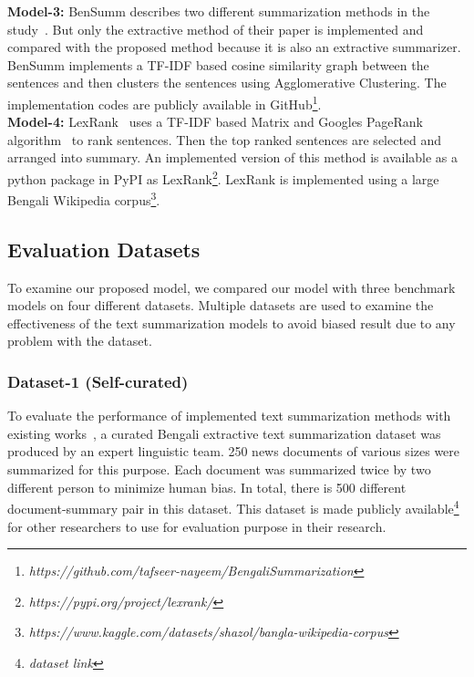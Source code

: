 \textbf{Model-3:} BenSumm describes two different summarization methods in the study~\cite{chowdhury-etal-2021-tfidf-clustering}. But only the extractive method of their paper is implemented and compared with the proposed method because it is also an extractive summarizer. BenSumm implements a TF-IDF based cosine similarity graph between the sentences and then clusters the sentences using Agglomerative Clustering. The implementation codes are publicly available in GitHub\footnote{\textit{https://github.com/tafseer-nayeem/BengaliSummarization}}.\\

\textbf{Model-4:} LexRank~\cite{Erkan-lexRank-2004} uses a TF-IDF based Matrix and Googles PageRank algorithm~\cite{page-PageRank-1999} to rank sentences. Then the top ranked sentences are selected and arranged into summary. An implemented version of this method is available as a python package in PyPI as LexRank\footnote{\textit{https://pypi.org/project/lexrank/}}. LexRank is implemented using a large Bengali Wikipedia corpus\footnote{\textit{https://www.kaggle.com/datasets/shazol/bangla-wikipedia-corpus}}.

\subsection{Evaluation Datasets}\label{subsec:evaluation-datasets}
To examine our proposed model, we compared our model with three benchmark models on four different datasets. Multiple datasets are used to examine the effectiveness of the text summarization models to avoid biased result due to any problem with the dataset.

\subsubsection{Dataset-1 (Self-curated)}
To evaluate the performance of implemented text summarization methods with existing works~\cite{chowdhury-etal-2021-tfidf-clustering,Erkan-lexRank-2004,roychowdhury-etal-2022-spectral-base}, a curated Bengali extractive text summarization dataset was produced by an expert linguistic team. 250 news documents of various sizes were summarized for this purpose. Each document was summarized twice by two different person to minimize human bias. In total, there is 500 different document-summary pair in this dataset. This dataset is made publicly available\footnote{\textit{dataset link}} for other researchers to use for evaluation purpose in their research.

